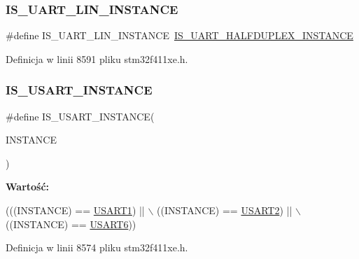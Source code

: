 \subsubsection{\texorpdfstring{I\+S\+\_\+\+U\+A\+R\+T\+\_\+\+L\+I\+N\+\_\+\+I\+N\+S\+T\+A\+N\+CE}{IS\_UART\_LIN\_INSTANCE}}
{\footnotesize\ttfamily \#define I\+S\+\_\+\+U\+A\+R\+T\+\_\+\+L\+I\+N\+\_\+\+I\+N\+S\+T\+A\+N\+CE~\hyperlink{group___exported__macros_ga69c4aa0c561c4c39c621710fbbb0cb7b}{I\+S\+\_\+\+U\+A\+R\+T\+\_\+\+H\+A\+L\+F\+D\+U\+P\+L\+E\+X\+\_\+\+I\+N\+S\+T\+A\+N\+CE}}



Definicja w linii 8591 pliku stm32f411xe.\+h.

\mbox{\label{group___exported__macros_gafbce654f84a7c994817453695ac91cbe}} 
\subsubsection{\texorpdfstring{I\+S\+\_\+\+U\+S\+A\+R\+T\+\_\+\+I\+N\+S\+T\+A\+N\+CE}{IS\_USART\_INSTANCE}}
{\footnotesize\ttfamily \#define I\+S\+\_\+\+U\+S\+A\+R\+T\+\_\+\+I\+N\+S\+T\+A\+N\+CE(\begin{DoxyParamCaption}\item[{}]{I\+N\+S\+T\+A\+N\+CE }\end{DoxyParamCaption})}

{\bfseries Wartość\+:}
\begin{DoxyCode}
(((INSTANCE) == \hyperlink{group___peripheral__declaration_ga92871691058ff7ccffd7635930cb08da}{USART1}) || \(\backslash\)
                                     ((INSTANCE) == \hyperlink{group___peripheral__declaration_gaf114a9eab03ca08a6fb720e511595930}{USART2}) || \(\backslash\)
                                     ((INSTANCE) == \hyperlink{group___peripheral__declaration_ga2dab39a19ce3dd05fe360dcbb7b5dc84}{USART6}))
\end{DoxyCode}


Definicja w linii 8574 pliku stm32f411xe.\+h.

\mbox{\label{group___exported__macros_gac2a8aaec233e19987232455643a04d6f}} 
